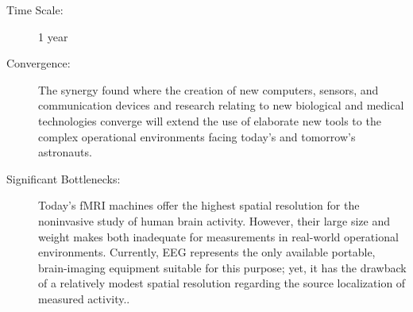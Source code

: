 \begin{description}
\item[Time Scale:] 1 year
 
\item[Convergence:] The synergy   found where the creation of new computers, sensors, and communication   devices and research relating to new biological and medical  technologies  converge will extend the use of elaborate new tools to the  complex  operational environments facing today’s and tomorrow's  astronauts. 
 
\item[Significant Bottlenecks:]   Today's \gls{fMRI} machines offer the highest spatial resolution for the   noninvasive study of human brain activity. However, their large size  and  weight makes both inadequate for measurements in real-world  operational  environments. Currently, \gls{EEG} represents the only available  portable,  brain-imaging equipment suitable for this purpose; yet, it  has the  drawback of a relatively modest spatial resolution regarding  the source  localization of measured activity..
 
\end{description}

 
